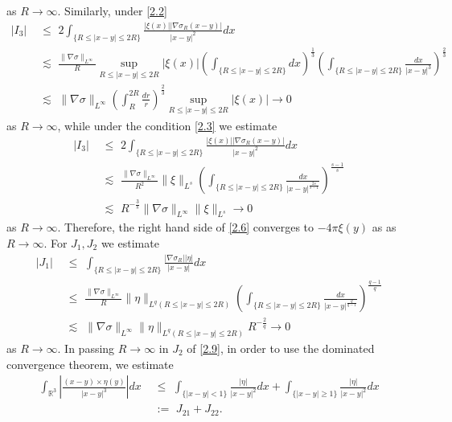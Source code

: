 \documentclass[12pt]{article}
\numberwithin{equation}{section}
\theoremstyle{definition}
\begin{document}
as $R\rightarrow\infty$. Similarly, under \eqref{2.2}
\begin{align*}
|I_3|\,\,&\leq\,\, 2\int_{\{R\leq|x-y|\leq2R\}}\frac{|\xi(x)||\nabla{\sigma}_R(x-y)|}{|x-y|^2}dx\\
         & \lesssim \,\,\frac{\|\nabla{\sigma}\|_{L^{\infty}}}{R}\sup_{R\leq|x-y|\leq2R}|\xi(x)|
         \left(\int_{\{R\leq|x-y|\leq2R\}}dx\right)^{\frac{1}{3}}\left(\int_{\{R\leq|x-y|\leq2R\}}\frac{dx}{|x-y|^3}\right)^{\frac{2}{3}}\\
         & \lesssim \,\, \|\nabla{\sigma}\|_{L^{\infty}}\left(\int_{R}^{2R}\frac{dr}{r}\right)^{\frac{2}{3}}\sup_{R\leq|x-y|\leq2R}|\xi(x)|\rightarrow0
\end{align*}
as $R\rightarrow\infty$, while under the condition \eqref{2.3} we estimate
\begin{align*}
|I_3|\,\,&\leq\,\, 2\int_{\{R\leq|x-y|\leq2R\}}\frac{|\xi(x)||\nabla{\sigma}_R(x-y)|}{|x-y|^2}dx\\
          & \lesssim \,\,\frac{\|\nabla{\sigma}\|_{L^{\infty}}}{R^2}\|\xi\|_{L^s} \left(\int_{\{R\leq|x-y|\leq2R\}}\frac{dx}{|x-y|^{\frac{2s}{s-1}}}\right)^{\frac{s-1}{s}}\\
         & \lesssim \,\, R^{-\frac{3}{s}} \|\nabla{\sigma}\|_{L^{\infty}}\|\xi\|_{L^s}\rightarrow0
\end{align*}
as $R\rightarrow\infty$. Therefore, the right hand side of \eqref{2.6} converges to $-4\pi\xi(y)$ as as $R\rightarrow\infty$.
For $J_1,J_2$ we estimate
\begin{align*}
|J_1|\,\,&\leq\,\, \int_{\{R\leq|x-y|\leq2R\}}\frac{|\nabla{\sigma}_R||\eta|}{|x-y|}dx\\
          &\leq\,\,\frac{\|\nabla{\sigma}\|_{L^{\infty}}}{R}\|\eta\|_{{L^q}(R\leq|x-y|\leq2R)} \left(\int_{\{R\leq|x-y|\leq2R\}}\frac{dx}{|x-y|^{\frac{q}{q-1}}}\right)^{\frac{q-1}{q}}\\
         & \lesssim \,\, \|\nabla{\sigma}\|_{L^{\infty}}\|\eta\|_{{L^q}(R\leq|x-y|\leq2R)}R^{-\frac{2}{q}}\rightarrow0
\end{align*}
as $R\rightarrow\infty$. In passing $R\rightarrow\infty$ in $J_2$ of \eqref{2.9}, in order to use the dominated convergence theorem, we estimate
\begin{align}\label{2.10}
\int_{\mathbb{R}^3}\left|\frac{(x-y)\times\eta(y)}{|x-y|^3}\right|dx\,\,
&\leq\,\,\int_{\{|x-y|<1\}}\frac{|\eta|}{|x-y|^2}dx+\int_{\{|x-y|\geq1\}}\frac{|\eta|}{|x-y|^2}dx\nonumber\\
&:=\,\, J_{21}+J_{22}.
\end{align}
\end{document}
